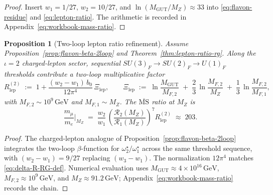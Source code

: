 \documentclass[aps,prd,onecolumn,amsmath,amssymb,nofootinbib,11pt]{revtex4-2}
\numberwithin{equation}{section}
\theoremstyle{plain}
\newtheorem{proposition}[theorem]{Proposition}
\theoremstyle{definition}
\theoremstyle{remark}
\begin{document}
\begin{proof}
Insert $w_1=1/27$, $w_2=10/27$, and
$\ln(M_{\mathrm{GUT}}/M_Z)\approx33$ into \eqref{eq:flavon-residue} and
\eqref{eq:lepton-ratio}. The arithmetic is recorded in
Appendix~\eqref{eq:workbook-mass-ratio}.
\end{proof}

\begin{proposition}[Two-loop lepton ratio refinement]\label{prop:lepton-ratio-2loop}
Assume Proposition~\ref{prop:flavon-beta-2loop} and Theorem~\ref{thm:lepton-ratio-rg}.
Along the $\iota=2$ charged-lepton sector, sequential $SU(3)_F\to SU(2)_F\to
U(1)_F$ thresholds contribute a two-loop multiplicative factor
\begin{equation}\label{eq:lepton-R2}
  R_{\mathrm{lep}}^{(2)}
  \;:=\;
  1 + \frac{(w_2-w_1)\,b_0}{12\pi^4}\,\Xi_{\mathrm{lep}},
  \qquad
  \Xi_{\mathrm{lep}}
  \;:=\;
  \ln\!\frac{M_{\mathrm{GUT}}}{M_{F,2}}
  \;+\;
  \frac{2}{3}\,\ln\!\frac{M_{F,2}}{M_Z}
  \;+\;
  \frac{1}{3}\,\ln\!\frac{M_{F,2}}{M_{F,1}},
\end{equation}
with $M_{F,2}\sim10^{9}\,\mathrm{GeV}$ and $M_{F,1}\sim M_Z$. The
$\overline{\mathrm{MS}}$ ratio at $M_Z$ is
\begin{equation}\label{eq:lepton-ratio-2loop}
  \frac{m_\mu}{m_e}\Big|_{M_Z}
  \;=\;
  \frac{w_2}{w_1}\,
  \left(
    \frac{\mathcal{R}_2(M_Z)}{\mathcal{R}_1(M_Z)}
  \right)^{\!7}
  R_{\mathrm{lep}}^{(2)}
  \;\approx\;
  203.
\end{equation}
\end{proposition}

\begin{proof}
The charged-lepton analogue of Proposition~\ref{prop:flavon-beta-2loop}
integrates the two-loop $\beta$-function for $\omega^\star_2/\omega^\star_1$
across the same threshold sequence, with $(w_2-w_1)=9/27$ replacing
$(w_3-w_1)$. The normalization $12\pi^4$ matches
\eqref{eq:delta-R-RG-def}. Numerical evaluation uses
$M_{\mathrm{GUT}}\approx4\times10^{16}\,\mathrm{GeV}$,
$M_{F,2}\approx10^{9}\,\mathrm{GeV}$, and $M_Z\approx91.2\,\mathrm{GeV}$;
Appendix~\eqref{eq:workbook-mass-ratio} records the chain.
\end{proof}
\end{document}
